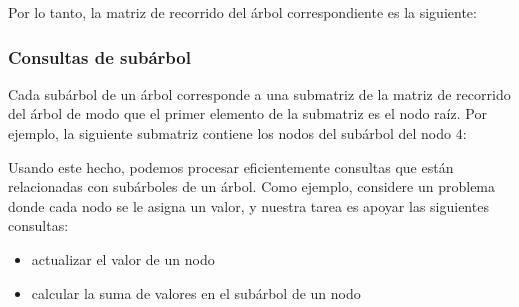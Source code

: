 Por lo tanto, la matriz de recorrido del árbol correspondiente es la siguiente:
\begin{center}
\end{center}

\subsubsection{Consultas de subárbol}

Cada subárbol de un árbol corresponde a una submatriz
de la matriz de recorrido del árbol de modo que
el primer elemento de la submatriz es el nodo raíz.
Por ejemplo, la siguiente submatriz contiene
los nodos del subárbol del nodo $4$:
\begin{center}
\end{center}
Usando este hecho, podemos procesar eficientemente consultas
que están relacionadas con subárboles de un árbol.
Como ejemplo, considere un problema donde cada nodo
se le asigna un valor, y nuestra tarea es apoyar
las siguientes consultas:
\begin{itemize}
\item actualizar el valor de un nodo
\item calcular la suma de valores en el subárbol de un nodo
\end{itemize}

